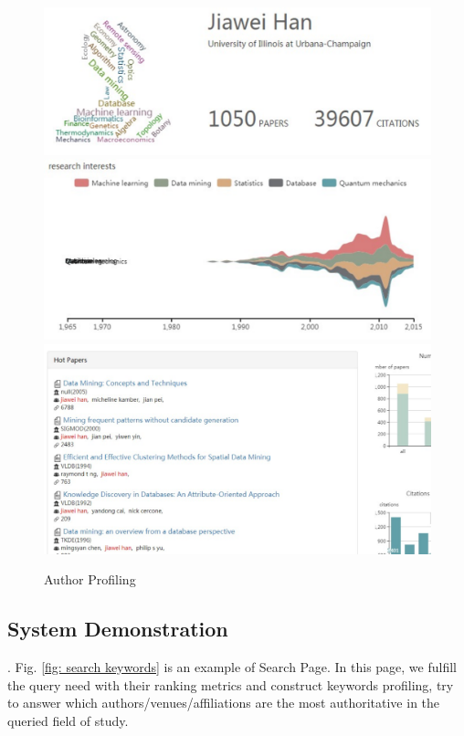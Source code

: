\begin{figure}
\centering
\includegraphics[width=\columnwidth]{hjwAvatar.pdf}
\includegraphics[width=\columnwidth]{hjwInterest.pdf}
\includegraphics[width=\columnwidth]{hjwPapers.pdf}
\caption{Author Profiling}
\label{fig:hjwProfile}
\vspace{-3ex}
\end{figure}

\subsection{System Demonstration}
. Fig. \ref{fig: search keywords} is an example of Search Page. In this page, we fulfill the query need with their ranking metrics and construct keywords profiling, 
try to answer which authors/venues/affiliations are the most authoritative in the queried field of study.

